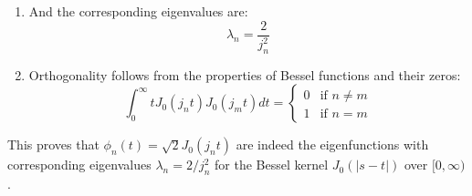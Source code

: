 \documentclass{article}
\begin{document}
\begin{enumerate}
    \item And the corresponding eigenvalues are:
    \begin{equation}
        \lambda_n = \frac{2}{j_n^2}
    \end{equation}

    \item Orthogonality follows from the properties of Bessel functions and their zeros:
    \begin{equation}
        \int_0^\infty t J_0(j_n t) J_0(j_m t) dt = 
        \begin{cases}
            0 & \text{if } n \neq m \\
            1 & \text{if } n = m
        \end{cases}
    \end{equation}
\end{enumerate}

This proves that $\phi_n(t) = \sqrt{2} J_0(j_n t)$ are indeed the eigenfunctions with corresponding eigenvalues $\lambda_n = 2 / j_n^2$ for the Bessel kernel $J_0(|s-t|)$ over $[0, \infty)$.
\end{document}
